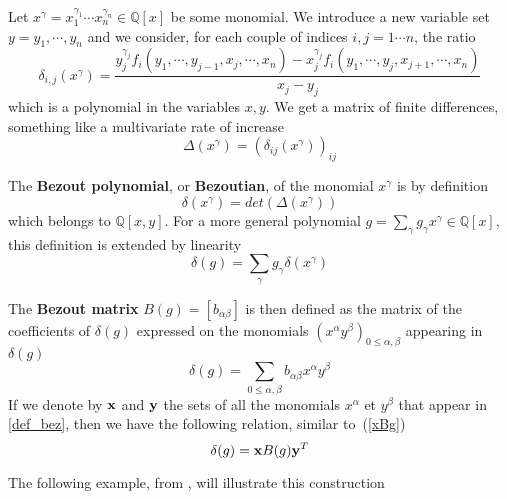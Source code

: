 \documentclass{standalone}
\begin{document}
\begin{defn}
Let $x^\gamma = x_1^{\gamma_1}\cdots x_n^{\gamma_n} \in \mathbb{Q}[x]$ be some monomial.
We introduce a new variable set $y = y_1,\cdots, y_n$ and we consider, for each couple of indices $i, j = 1\cdots n$, the ratio
\begin{equation}
\label{finite_diff}
\delta_{i,j}(x^\gamma) = \dfrac{y_j^{\gamma_j}f_i(y_1,\cdots, y_{j-1},x_j,\cdots,x_n) - x_j^{\gamma_j}f_i(y_1,\cdots,y_j,x_{j+1},\cdots,x_n)}{x_j - y_j}
\end{equation}
which is a polynomial in the variables $x, y$. We get a matrix of finite differences, something like a multivariate rate of increase
\begin{equation}
\label{Delta}
\Delta(x^\gamma) = (\delta_{ij}(x^\gamma))_{ij}
\end{equation}

The {\bf Bezout polynomial}, or {\bf Bezoutian}, of the monomial $x^\gamma$ is by definition
\begin{equation}
	\delta(x^\gamma) = det(\Delta(x^\gamma))
\end{equation}
which belongs to $\mathbb{Q}[x, y]$. For a more general polynomial $g = \sum_\gamma g_\gamma x^\gamma \in \mathbb{Q}[x]$, this definition is extended by linearity 
$$\delta(g) = \sum_\gamma g_\gamma \delta(x^\gamma)$$

The {\bf Bezout matrix} $B(g) = [b_{\alpha\beta}]$ is then defined as the matrix of the coefficients of $\delta(g)$ expressed on the monomials $(x^\alpha y^\beta)_{0 \le \alpha,\beta}$ appearing in $\delta(g)$
\begin{equation}
\label{def_bez}
\delta(g) = \sum_{0 \le \alpha,\beta} b_{\alpha\beta} x^\alpha y^\beta
\end{equation}
If we denote by $\bold{x}$ and $\bold{y}$ the sets of all the monomials $x^\alpha$ et $y^\beta$ that appear in \ref{def_bez}, then we have the following relation, similar to~(\ref{xBg})
\begin{equation}
	\delta(g) = \bold{x} B(g) \bold{y}^T
\end{equation}
\end{defn}
The following example, from \cite{jpc}, will illustrate this construction
\end{document}
